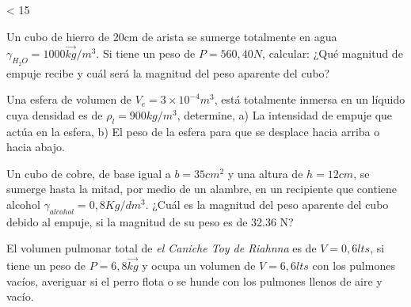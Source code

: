 \documentclass[./examen.tex]{subfiles}
\newcounter{z}
\newcommand\y[2]{
  \loop \ifnum\value{z} < #1
    #2%
    \stepcounter{z}%
  \repeat
}
\begin{document}
\y{15}{
\begin{center}

\makebox[\textwidth]{Nombre y Apellido:\enspace\hrulefill}
\end{center}
\begin{questions}
\small
\question[2] Un cubo de hierro de 20cm de arista se sumerge totalmente en agua $\gamma_{H_2O}=1000\vec{kg}/m^3$. Si tiene un peso de $P=560,40 N$, calcular: ¿Qué magnitud de empuje recibe y cuál será la magnitud del peso aparente del cubo?

\question[2] Una esfera de volumen de $V_e=3 \times 10^{-4}m^3$, está totalmente inmersa en un líquido cuya densidad es de $\rho_{l}=900 kg/m^3$, determine, a) La intensidad de empuje que actúa en la esfera, b) El peso de la esfera para que se desplace hacia arriba o hacia abajo. 

\question[3] Un cubo de cobre, de base igual a $b=35cm^2$ y una altura de $h=12 cm$, se sumerge hasta la mitad, por medio de un alambre, en un recipiente que contiene alcohol $\gamma_{alcohol}=0,8Kg/dm^3$.  ¿Cuál es la magnitud del peso aparente del cubo debido al empuje, si la magnitud de su peso es de 32.36 N?

\question[3] El volumen pulmonar total de \emph{el Caniche Toy de Riahnna} es de $V=0,6lts$, si tiene un peso de $P=6,8\vec{kg}$ y ocupa un volumen de $V=6,6lts$ con los pulmones vacíos, averiguar si el perro flota o se hunde con los pulmones llenos de aire y vacío.

\end{questions}

}
\end{document}
